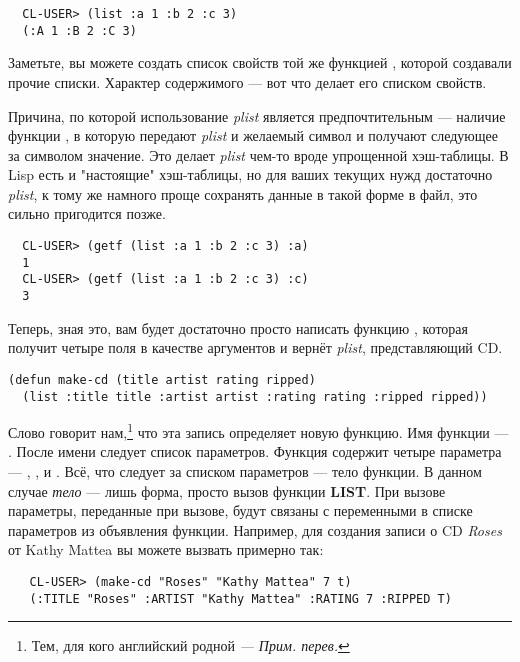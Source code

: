 \begin{verbatim}
  CL-USER> (list :a 1 :b 2 :c 3)
  (:A 1 :B 2 :C 3)
\end{verbatim}

Заметьте, вы можете создать список свойств той же функцией , которой создавали
прочие списки. Характер содержимого --- вот что делает его списком свойств.

Причина, по которой использование \textit{plist} является предпочтительным --- наличие
функции , в которую передают \textit{plist} и желаемый символ и получают
следующее за символом значение. Это делает \textit{plist} чем-то вроде упрощенной
хэш-таблицы. В Lisp есть и "настоящие" хэш-таблицы, но для ваших текущих нужд достаточно
\textit{plist}, к тому же намного проще сохранять данные в такой форме в файл, это сильно
пригодится позже.

\begin{verbatim}
  CL-USER> (getf (list :a 1 :b 2 :c 3) :a)
  1
  CL-USER> (getf (list :a 1 :b 2 :c 3) :c)
  3
\end{verbatim}

Теперь, зная это, вам будет достаточно просто написать функцию , которая
получит четыре поля в качестве аргументов и вернёт \textit{plist}, представляющий CD.

\begin{lstlisting}
(defun make-cd (title artist rating ripped)
  (list :title title :artist artist :rating rating :ripped ripped))
\end{lstlisting}

Слово  говорит нам,\footnote{Тем, для кого английский родной \textit{---
Прим. перев.}} что эта запись определяет новую функцию. Имя функции ---
. После имени следует список параметров. Функция содержит четыре параметра
--- , ,  и . Всё, что следует за
списком параметров --- тело функции. В данном случае \textit{тело} --- лишь форма, просто
вызов функции \textbf{LIST}. При вызове  параметры, переданные при вызове,
будут связаны с переменными в списке параметров из объявления функции. Например, для
создания записи о CD \textit{Roses} от Kathy Mattea вы можете вызвать 
примерно так:

\begin{verbatim}
   CL-USER> (make-cd "Roses" "Kathy Mattea" 7 t)
   (:TITLE "Roses" :ARTIST "Kathy Mattea" :RATING 7 :RIPPED T) 
\end{verbatim}

